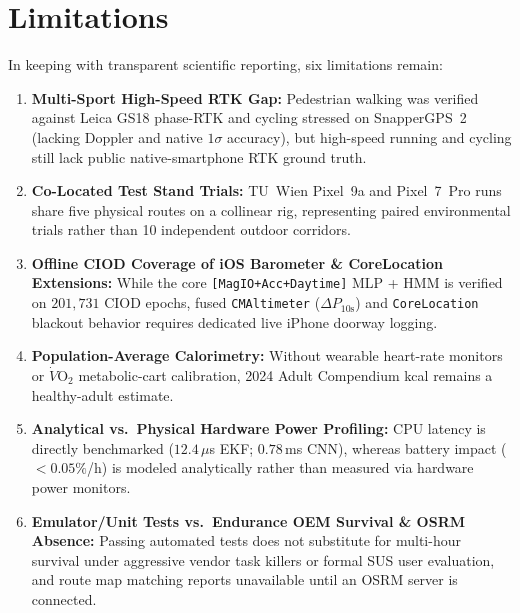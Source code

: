 \section{Limitations}
In keeping with transparent scientific reporting, six limitations remain:
\begin{enumerate}
    \item \textbf{Multi-Sport High-Speed RTK Gap:} Pedestrian walking was verified against Leica GS18 phase-RTK and cycling stressed on SnapperGPS~2 (lacking Doppler and native $1\sigma$ accuracy), but high-speed running and cycling still lack public native-smartphone RTK ground truth.
    \item \textbf{Co-Located Test Stand Trials:} TU~Wien Pixel~9a and Pixel~7~Pro runs share five physical routes on a collinear rig, representing paired environmental trials rather than 10 independent outdoor corridors.
    \item \textbf{Offline CIOD Coverage of iOS Barometer \& CoreLocation Extensions:} While the core \texttt{[MagIO+Acc+Daytime]} MLP + HMM is verified on $201{,}731$ CIOD epochs, fused \texttt{CMAltimeter} ($\Delta P_{10\text{s}}$) and \texttt{CoreLocation} blackout behavior requires dedicated live iPhone doorway logging.
    \item \textbf{Population-Average Calorimetry:} Without wearable heart-rate monitors or $\dot{V}\text{O}_2$ metabolic-cart calibration, 2024 Adult Compendium kcal remains a healthy-adult estimate.
    \item \textbf{Analytical vs.\ Physical Hardware Power Profiling:} CPU latency is directly benchmarked ($12.4$\,$\mu$s EKF; $0.78$\,ms CNN), whereas battery impact ($<0.05\%$/h) is modeled analytically rather than measured via hardware power monitors.
    \item \textbf{Emulator/Unit Tests vs.\ Endurance OEM Survival \& OSRM Absence:} Passing automated tests does not substitute for multi-hour survival under aggressive vendor task killers or formal SUS user evaluation, and route map matching reports unavailable until an OSRM server is connected.
\end{enumerate}

